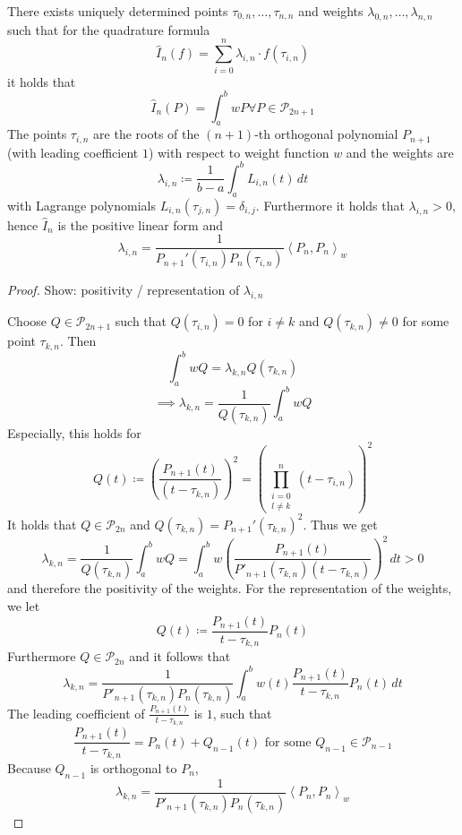 \documentclass[a4paper]{article}
\numberwithin{lecref}{section}
\theoremstyle{break}
\newcommand{\IP}[2]{\left\langle#1, #2\right\rangle}
\begin{document}
\begin{theorem}
  \label{theorem:5-13}
  There exists uniquely determined points $\tau_{0,n}, \dots, \tau_{n,n}$ and weights $\lambda_{0,n}, \dots, \lambda_{n,n}$ such that for the quadrature formula
  \[ \hat{I}_n(f) = \sum_{i=0}^n \lambda_{i,n} \cdot f(\tau_{i,n}) \]
  it holds that
  \[ \hat{I}_n(P) = \int_a^b wP \forall P \in \mathcal P_{2n+1} \]
  The points $\tau_{i,n}$ are the roots of the $(n+1)$-th orthogonal polynomial $P_{n+1}$ (with leading coefficient $1$) with respect to weight function $w$ and the weights are
  \[ \lambda_{i,n} \coloneqq \frac{1}{b-a} \int_a^b L_{i,n}(t) \, dt \]
  with Lagrange polynomials $L_{i,n}(\tau_{j,n}) = \delta_{i,j}$. Furthermore it holds that $\lambda_{i,n} > 0$, hence $\hat{I}_n$ is the positive linear form and
  \[ \lambda_{i,n} = \frac{1}{P_{n+1}'(\tau_{i,n}) P_n(\tau_{i,n})} \IP{P_n}{P_n}_w \]
\end{theorem}

\begin{proof}
  Show: positivity / representation of $\lambda_{i,n}$

  Choose $Q \in \mathcal P_{2n+1}$ such that $Q(\tau_{i,n}) = 0$ for $i \neq k$ and $Q(\tau_{k,n}) \neq 0$ for some point $\tau_{k,n}$. Then
  \[ \int_a^b w Q = \lambda_{k,n} Q(\tau_{k,n}) \]
  \[ \implies \lambda_{k,n} = \frac{1}{Q(\tau_{k,n})} \int_a^b wQ \]
  Especially, this holds for
  \[ Q(t) \coloneqq \left(\frac{P_{n+1}(t)}{(t - \tau_{k,n})}\right)^2 = \left(\prod_{\substack{i = 0 \\ l \neq k}}^n (t - \tau_{i,n})\right)^2 \]
  It holds that $Q \in \mathcal P_{2n}$ and $Q(\tau_{k,n}) = P_{n+1}'(\tau_{k,n})^2$.
  Thus we get
  \[ \lambda_{k,n} = \frac{1}{Q(\tau_{k,n})} \int_a^b wQ = \int_a^b w \left(\frac{P_{n+1}(t)}{P'_{n+1}(\tau_{k,n}) (t - \tau_{k,n})}\right)^2 \, dt > 0 \]
  and therefore the positivity of the weights. For the representation of the weights, we let
  \[ Q(t) \coloneqq \frac{P_{n+1}(t)}{t - \tau_{k,n}} P_n(t) \]
  Furthermore $Q \in \mathcal P_{2n}$ and it follows that
  \[ \lambda_{k,n} = \frac{1}{P'_{n+1}(\tau_{k,n}) P_n(\tau_{k,n})} \int_a^b w(t) \frac{P_{n+1}(t)}{t - \tau_{k,n}} P_n(t) \, dt \]
  The leading coefficient of $\frac{P_{n+1}(t)}{t - \tau_{k,n}}$ is $1$, such that
  \[ \frac{P_{n+1}(t)}{t - \tau_{k,n}} = P_n(t) + Q_{n-1}(t) \text{ for some } Q_{n-1} \in \mathcal P_{n-1} \]
  Because $Q_{n-1}$ is orthogonal to $P_n$,
  \[ \lambda_{k,n} = \frac{1}{P'_{n+1}(\tau_{k,n}) P_n(\tau_{k,n})} \IP{P_n}{P_n}_w \]
\end{proof}
\end{document}
